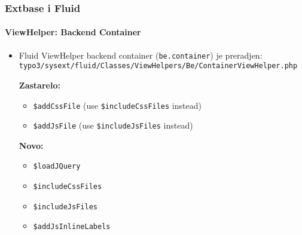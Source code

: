 
\begin{frame}[fragile]
	\frametitle{Extbase i Fluid}
	\framesubtitle{ViewHelper: Backend Container}

	\lstset{
		basicstyle=\smaller\ttfamily
	}

	\begin{itemize}
		\item Fluid ViewHelper backend container (\texttt{be.container}) je preradjen:\newline
			\smaller\texttt{typo3/sysext/fluid/Classes/ViewHelpers/Be/ContainerViewHelper.php}\normalsize\newline

			\smaller\textbf{Zastarelo:}\normalsize
			\begin{itemize}
				\item \texttt{\$addCssFile} (use \texttt{\$includeCssFiles} instead)
				\item \texttt{\$addJsFile} (use \texttt{\$includeJsFiles} instead)
			\end{itemize}

			\smaller\textbf{Novo:}\normalsize
			\begin{itemize}
				\item \texttt{\$loadJQuery}
				\item \texttt{\$includeCssFiles}
				\item \texttt{\$includeJsFiles}
				\item \texttt{\$addJsInlineLabels}
			\end{itemize}

	\end{itemize}

\end{frame}


